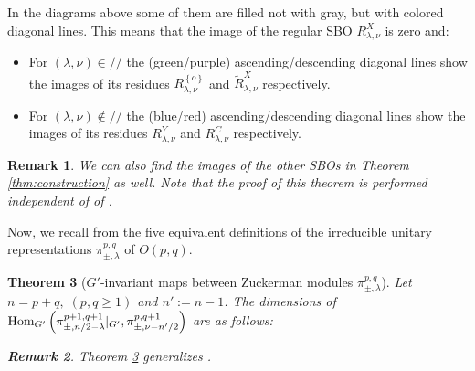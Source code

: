 \documentclass[12pt]{article} %
\newtheorem{theorem}{Theorem}
\newcommand{\Hom}{\mbox{\normalfont Hom}}
\newtheorem{remark}[theorem]{Remark}
\theoremstyle{definition}
\theoremstyle{exampstyle} \newtheorem{examp}[theorem]{Theorem}
\renewcommand{\ss}{//}
\begin{document}
	In the diagrams above some of them are filled not with gray, but with colored diagonal lines. This means that the image of the regular SBO $R_{\lambda,\nu}^X$ is zero and:
	\begin{itemize}
		\item For $(\lambda,\nu)\in\ss$ the (green/purple)
			ascending/descending diagonal lines show the images of its residues $R_{\lambda,\nu}^{ \left\{ o \right\}}$ and $\tilde{R}_{\lambda,\nu}^X$ 
			respectively.
		\item For $(\lambda,\nu)\notin\ss$ the (blue/red) ascending/descending diagonal lines show the images of its residues $R_{\lambda,\nu}^{Y}$ and ${R}_{\lambda,\nu}^C$ 
			respectively.
	\end{itemize}
\begin{remark}
	We can also find the images of the other SBOs in Theorem \ref{thm:construction} as well.
	Note that
	the proof of this theorem is performed \textit{independent of} of \cite{howe1993homogeneous}.
\end{remark}
Now, we recall from \cite{KO2} the five equivalent definitions of the
irreducible unitary representations $\pi_{\pm,\lambda}^{p,q}$ of $O(p,q)$.
\begin{theorem}[$G'$-invariant maps between Zuckerman modules $\pi_{\pm,\lambda}^{p,q}$]\label{thm:Aq}
	Let $n=p+q,\;(p,q\ge1)$ and $n':=n-1$.
	The dimensions of $\Hom_{G'}\left(\pi_{\pm,{n}/{2}-\lambda}^{p+1,q+1}\kern-0.3em\mid_{G'} ,\pi_{\pm,\nu-{n'}/{2}}^{p,q+1} \right)$
	are as follows:\newline
{}\\\vspace{\baselineskip}
\begin{remark}
Theorem \ref{thm:Aq} generalizes \cite[Thms. 12.1 and 1.3]{kobayashi2015symmetry}.
\end{remark}
\end{theorem}
\nocite{kobayashi2015program}
\small


\end{document}
